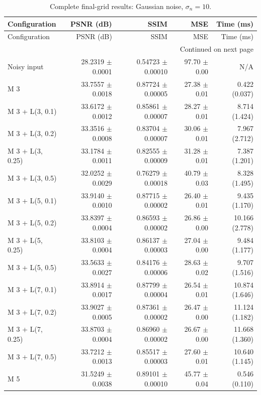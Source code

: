\begin{longtable}{lrrrr}
\caption{Complete final-grid results: Gaussian noise, $\sigma_n=10$.}\\
\toprule Configuration & PSNR (dB) & SSIM & MSE & Time (ms) \\ \midrule
\endfirsthead
\toprule Configuration & PSNR (dB) & SSIM & MSE & Time (ms) \\ \midrule
\endhead
\midrule \multicolumn{5}{r}{Continued on next page}\\
\endfoot
\bottomrule
\endlastfoot
Noisy input & 28.2319 $\pm$ 0.0001 & 0.54723 $\pm$ 0.00010 & 97.70 $\pm$ 0.00 & N/A \\
M 3 & 33.7557 $\pm$ 0.0018 & 0.87724 $\pm$ 0.00005 & 27.38 $\pm$ 0.01 & 0.422 (0.037) \\
M 3 + L(3, 0.1) & 33.6172 $\pm$ 0.0012 & 0.85861 $\pm$ 0.00007 & 28.27 $\pm$ 0.01 & 8.714 (1.424) \\
M 3 + L(3, 0.2) & 33.3516 $\pm$ 0.0008 & 0.83704 $\pm$ 0.00007 & 30.06 $\pm$ 0.01 & 7.967 (2.712) \\
M 3 + L(3, 0.25) & 33.1784 $\pm$ 0.0011 & 0.82555 $\pm$ 0.00009 & 31.28 $\pm$ 0.01 & 7.387 (1.201) \\
M 3 + L(3, 0.5) & 32.0252 $\pm$ 0.0029 & 0.76279 $\pm$ 0.00018 & 40.79 $\pm$ 0.03 & 8.328 (1.495) \\
M 3 + L(5, 0.1) & 33.9140 $\pm$ 0.0010 & 0.87715 $\pm$ 0.00002 & 26.40 $\pm$ 0.01 & 9.435 (1.170) \\
M 3 + L(5, 0.2) & 33.8397 $\pm$ 0.0004 & 0.86593 $\pm$ 0.00002 & 26.86 $\pm$ 0.00 & 10.166 (2.778) \\
M 3 + L(5, 0.25) & 33.8103 $\pm$ 0.0004 & 0.86137 $\pm$ 0.00003 & 27.04 $\pm$ 0.00 & 9.484 (1.177) \\
M 3 + L(5, 0.5) & 33.5633 $\pm$ 0.0027 & 0.84176 $\pm$ 0.00006 & 28.63 $\pm$ 0.02 & 9.707 (1.516) \\
M 3 + L(7, 0.1) & 33.8914 $\pm$ 0.0017 & 0.87799 $\pm$ 0.00004 & 26.54 $\pm$ 0.01 & 10.874 (1.646) \\
M 3 + L(7, 0.2) & 33.9027 $\pm$ 0.0005 & 0.87361 $\pm$ 0.00002 & 26.47 $\pm$ 0.00 & 11.124 (1.182) \\
M 3 + L(7, 0.25) & 33.8703 $\pm$ 0.0004 & 0.86960 $\pm$ 0.00002 & 26.67 $\pm$ 0.00 & 11.668 (1.360) \\
M 3 + L(7, 0.5) & 33.7212 $\pm$ 0.0013 & 0.85517 $\pm$ 0.00003 & 27.60 $\pm$ 0.01 & 10.640 (1.145) \\
M 5 & 31.5249 $\pm$ 0.0038 & 0.89101 $\pm$ 0.00010 & 45.77 $\pm$ 0.04 & 0.546 (0.110) \\

\end{longtable}
